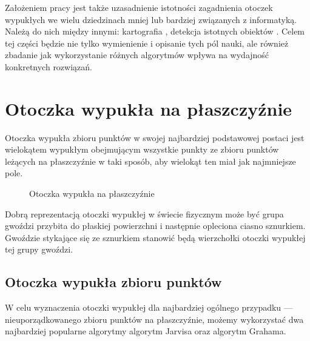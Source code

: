     Założeniem pracy jest także uzasadnienie istotności zagadnienia otoczek wypukłych we wielu dziedzinach mniej lub bardziej związanych z informatyką. Należą do nich między innymi: kartografia \cite{cartography}, detekcja istotnych obiektów \cite{detection}. Celem tej części będzie nie tylko wymienienie i opisanie tych pól nauki, ale również zbadanie jak wykorzystanie różnych algorytmów wpływa na wydajność konkretnych rozwiązań.

    \chapter{Otoczka wypukła na płaszczyźnie}\label{chap:theory}
    Otoczka wypukła zbioru punktów w swojej najbardziej podstawowej postaci jest wielokątem wypukłym obejmującym wszystkie punkty ze zbioru punktów leżących na płaszczyźnie w taki sposób, aby wielokąt ten miał jak najmniejsze pole.    
    \begin{figure}[h!]
        	\begin{center}
    			
    			\caption{Otoczka wypukła na płaszczyźnie}\label{fig:example_hull}
    	\end{center}
    	\mysource
    	\vspace{-0.8cm}
    \end{figure}
    
    Dobrą reprezentacją otoczki wypukłej w świecie fizycznym może być grupa gwoździ przybita do płaskiej powierzchni i następnie opleciona ciasno sznurkiem. Gwoździe stykające się ze sznurkiem stanowić będą wierzchołki otoczki wypukłej tej grupy gwoździ.
        \section{Otoczka wypukła zbioru punktów}
        W celu wyznaczenia otoczki wypukłej dla najbardziej ogólnego przypadku --- nieuporządkowanego zbioru punktów na płaszczyźnie, możemy wykorzystać dwa najbardziej popularne algorytmy algorytm Jarvisa oraz algorytm Grahama.
        
